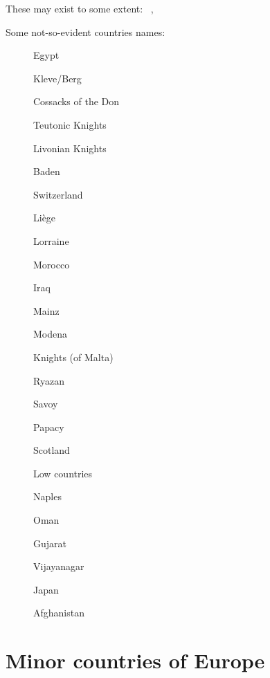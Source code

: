  These may exist to some extent:
%
{\theminorreligionshort{\loopitem}~\pays{\loopitem}}{, }

\aparag Some not-so-evident countries names:

\begin{multicols}{3}
  \begin{description}
  \item[\paysegypte] Egypt
  \item[\paysberg] Kleve/Berg
  \item[\payscosaquesdon] Cossacks of the Don
  \item[] Teutonic Knights
  \item[] Livonian Knights
  \item[\paysbade] Baden
  \item[\payssuisse] Switzerland
  \item[\paysliege] Liège
  \item[\payslorraine] Lorraine
  \item[\paysmaroc] Morocco
  \item[\paysirak] Iraq
  \item[\paysmayence] Mainz
  \item[\paysmodene] Modena
  \item[\payschevaliers] Knights (of Malta)
  \item[\paysryazan] Ryazan
  \item[\payssavoie] Savoy
  \item[\payspapaute] Papacy
  \item[\paysecosse] Scotland
  \item[\paysprovincesne] Low countries
  \item[\paysnaples] Naples
  \item[\paysoman] Oman
  \item[\paysgujarat] Gujarat
  \item[\paysvijayanagar] Vijayanagar
  \item[\paysjapon] Japan
  \item[\paysafghans] Afghanistan
  \end{description}
\end{multicols}
\vfill

\section{Minor countries of Europe}


